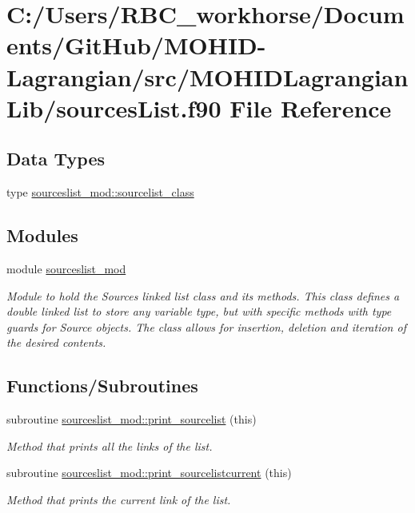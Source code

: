 \hypertarget{sources_list_8f90}{}\section{C\+:/\+Users/\+R\+B\+C\+\_\+workhorse/\+Documents/\+Git\+Hub/\+M\+O\+H\+I\+D-\/\+Lagrangian/src/\+M\+O\+H\+I\+D\+Lagrangian\+Lib/sources\+List.f90 File Reference}
\label{sources_list_8f90}
\subsection*{Data Types}
\begin{DoxyCompactItemize}
\item 
type \mbox{\hyperlink{structsourceslist__mod_1_1sourcelist__class}{sourceslist\+\_\+mod\+::sourcelist\+\_\+class}}
\end{DoxyCompactItemize}
\subsection*{Modules}
\begin{DoxyCompactItemize}
\item 
module \mbox{\hyperlink{namespacesourceslist__mod}{sourceslist\+\_\+mod}}
\begin{DoxyCompactList}\small\item\em Module to hold the Sources linked list class and its methods. This class defines a double linked list to store any variable type, but with specific methods with type guards for Source objects. The class allows for insertion, deletion and iteration of the desired contents. \end{DoxyCompactList}\end{DoxyCompactItemize}
\subsection*{Functions/\+Subroutines}
\begin{DoxyCompactItemize}
\item 
subroutine \mbox{\hyperlink{namespacesourceslist__mod_a1c359b48ae24045622cb6ec36a1bf6b2}{sourceslist\+\_\+mod\+::print\+\_\+sourcelist}} (this)
\begin{DoxyCompactList}\small\item\em Method that prints all the links of the list. \end{DoxyCompactList}\item 
subroutine \mbox{\hyperlink{namespacesourceslist__mod_a0d0f94845a8cd355e99e2e82d9ca3d35}{sourceslist\+\_\+mod\+::print\+\_\+sourcelistcurrent}} (this)
\begin{DoxyCompactList}\small\item\em Method that prints the current link of the list. \end{DoxyCompactList}\end{DoxyCompactItemize}
